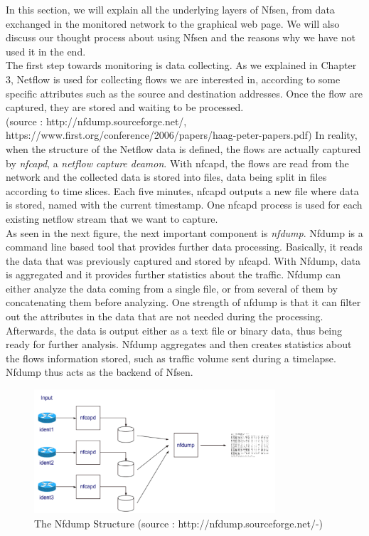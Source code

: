 In this section, we will explain all the underlying layers of Nfsen, from data exchanged in the monitored network to the graphical web page. We will also discuss our thought process about using Nfsen and the reasons why we have not used it in the end.\\

The first step towards monitoring is data collecting. As we explained in Chapter 3, Netflow is used for collecting flows we are interested in, according to some specific attributes such as the source and destination addresses. Once the flow are captured, they are stored and waiting to be processed. \\

(source : http://nfdump.sourceforge.net/, https://www.first.org/conference/2006/papers/haag-peter-papers.pdf)
In reality, when the structure of the Netflow data is defined, the flows are actually captured by \textit{nfcapd}, a \textit{netflow capture deamon}. With nfcapd, the flows are read from the network and the collected data is stored into files, data being split in files according to time slices. Each five minutes, nfcapd outputs a new file where data is stored, named with the current timestamp. One nfcapd process is used for each existing netflow stream that we want to capture.\\

As seen in the next figure, the next important component is \textit{nfdump}. Nfdump is a command line based tool that provides further data processing. Basically, it reads the data that was previously captured and stored by nfcapd. With Nfdump, data is aggregated and it provides further statistics about the traffic. Nfdump can either analyze the data coming from a single file, or from several of them by concatenating them before analyzing. One strength of nfdump is that it can filter out the attributes in the data that are not needed during the processing. Afterwards, the data is output either as a text file or binary data, thus being ready for further analysis. Nfdump aggregates and then creates statistics about the flows information stored, such as traffic volume sent during a timelapse. Nfdump thus acts as the backend of Nfsen.\\

\begin{figure}[!h]
	\centering
	\includegraphics[width=0.8\textwidth]{res/nfdump.png}
	\caption{The Nfdump Structure (source : http://nfdump.sourceforge.net/-)}
	\label{fig:nfdump}
\end{figure}

